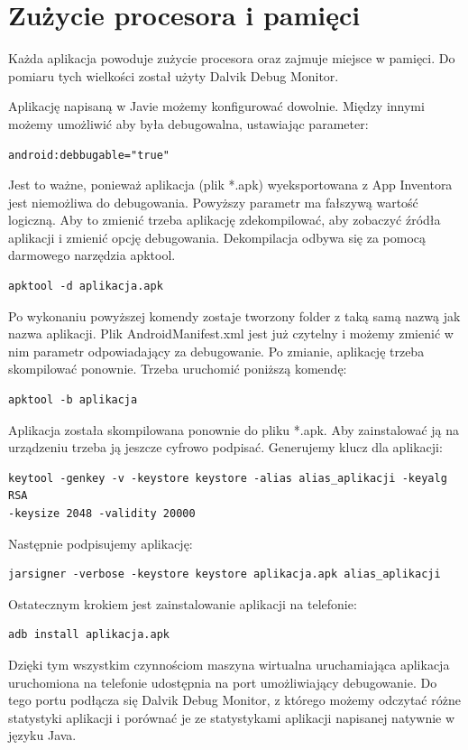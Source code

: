 \section{Zużycie procesora i pamięci}

Każda aplikacja powoduje zużycie procesora oraz zajmuje miejsce w pamięci. Do pomiaru tych wielkości został użyty Dalvik Debug Monitor.

Aplikację napisaną w Javie możemy konfigurować dowolnie. Między innymi możemy umożliwić aby była debugowalna, ustawiając parameter:

\begin{lstlisting}
android:debbugable="true"
\end{lstlisting}

Jest to ważne, ponieważ aplikacja (plik *.apk) wyeksportowana z App Inventora jest niemożliwa do debugowania. Powyższy parametr ma fałszywą wartość logiczną. Aby to zmienić trzeba aplikację zdekompilować, aby zobaczyć źródła aplikacji i zmienić opcję debugowania. Dekompilacja odbywa się za pomocą darmowego narzędzia apktool.

\begin{lstlisting}
apktool -d aplikacja.apk
\end{lstlisting}

Po wykonaniu powyższej komendy zostaje tworzony folder z taką samą nazwą jak nazwa aplikacji. Plik AndroidManifest.xml jest już czytelny i możemy zmienić w nim parametr odpowiadający za debugowanie. Po zmianie, aplikację trzeba skompilować ponownie. Trzeba uruchomić poniższą komendę:

\begin{lstlisting}
apktool -b aplikacja
\end{lstlisting}

Aplikacja została skompilowana ponownie do pliku *.apk. Aby zainstalować ją na urządzeniu trzeba ją jeszcze cyfrowo podpisać. Generujemy klucz dla aplikacji:

\begin{lstlisting}
keytool -genkey -v -keystore keystore -alias alias_aplikacji -keyalg RSA 
-keysize 2048 -validity 20000
\end{lstlisting}

Następnie podpisujemy aplikację:

\begin{lstlisting}
jarsigner -verbose -keystore keystore aplikacja.apk alias_aplikacji
\end{lstlisting}

Ostatecznym krokiem jest zainstalowanie aplikacji na telefonie:

\begin{lstlisting}
adb install aplikacja.apk
\end{lstlisting}

Dzięki tym wszystkim czynnościom maszyna wirtualna uruchamiająca aplikacja uruchomiona na telefonie udostępnia na port umożliwiający debugowanie. Do tego portu podłącza się Dalvik Debug Monitor, z którego możemy odczytać różne statystyki aplikacji i porównać je ze statystykami aplikacji napisanej natywnie w języku Java.
